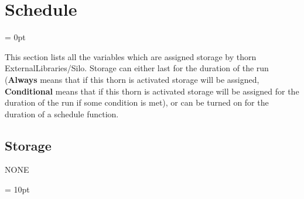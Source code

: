
\section{Schedule} 


\parskip = 0pt


\noindent This section lists all the variables which are assigned storage by thorn ExternalLibraries/Silo.  Storage can either last for the duration of the run ({\bf Always} means that if this thorn is activated storage will be assigned, {\bf Conditional} means that if this thorn is activated storage will be assigned for the duration of the run if some condition is met), or can be turned on for the duration of a schedule function.


\subsection*{Storage}NONE

\vspace{5mm}\parskip = 10pt 
